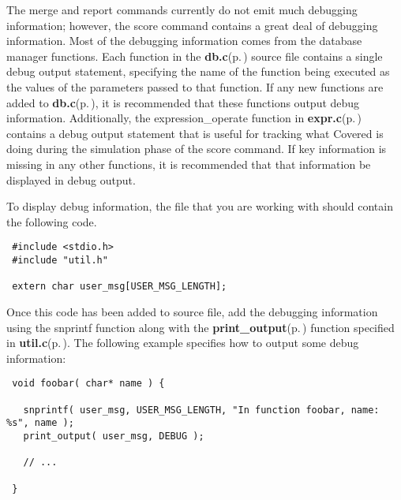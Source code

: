 \begin{Desc}
\item[]The merge and report commands currently do not emit much debugging information; however, the score command contains a great deal of debugging information. Most of the debugging information comes from the database manager functions. Each function in the {\bf db.c}{\rm (p.\,\pageref{db_8c})} source file contains a single debug output statement, specifying the name of the function being executed as the values of the parameters passed to that function. If any new functions are added to {\bf db.c}{\rm (p.\,\pageref{db_8c})}, it is recommended that these functions output debug information. Additionally, the expression\_\-operate function in {\bf expr.c}{\rm (p.\,\pageref{expr_8c})} contains a debug output statement that is useful for tracking what Covered is doing during the simulation phase of the score command. If key information is missing in any other functions, it is recommended that that information be displayed in debug output.\end{Desc}
\begin{Desc}
\item[]To display debug information, the file that you are working with should contain the following code.\end{Desc}
\begin{Desc}
\item[]

\footnotesize\begin{verbatim} #include <stdio.h>
 #include "util.h"
 
 extern char user_msg[USER_MSG_LENGTH];
\end{verbatim}\normalsize
\end{Desc}
\begin{Desc}
\item[]Once this code has been added to source file, add the debugging information using the snprintf function along with the {\bf print\_\-output}{\rm (p.\,\pageref{util_8h_a2})} function specified in {\bf util.c}{\rm (p.\,\pageref{util_8c})}. The following example specifies how to output some debug information:\end{Desc}
\begin{Desc}
\item[]

\footnotesize\begin{verbatim} void foobar( char* name ) {
   
   snprintf( user_msg, USER_MSG_LENGTH, "In function foobar, name: %s", name );
   print_output( user_msg, DEBUG );
   
   // ...
   
 }
\end{verbatim}\normalsize
\end{Desc}

